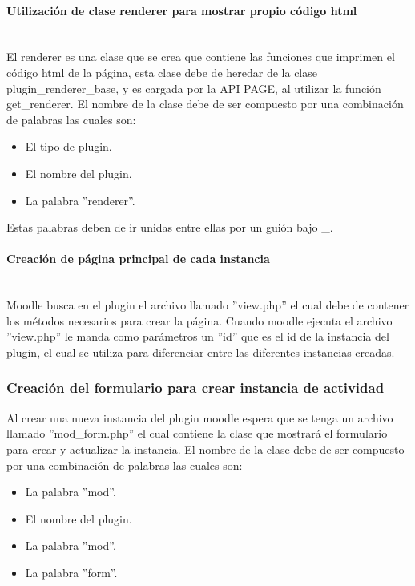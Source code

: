 			\paragraph{Utilización de clase renderer para mostrar propio código html}\mbox{}\\

			El renderer es una clase que se crea que contiene las funciones que imprimen el código html de la página, esta clase debe de heredar de la clase plugin\_renderer\_base, y es cargada por la API PAGE, al utilizar la función get\_renderer. El nombre de la clase debe de ser compuesto por una combinación de palabras las cuales son:
      \begin{itemize}
        \item El tipo de plugin.
        \item El nombre del plugin.
        \item La palabra ''renderer''.
      \end{itemize}

			Estas palabras deben de ir unidas entre ellas por un guión bajo \_.

    \paragraph{Creación de página principal de cada instancia}\mbox{}\\

			Moodle busca en el plugin el archivo llamado ''view.php'' el cual debe de contener los métodos necesarios para crear la página. Cuando moodle ejecuta el archivo ''view.php'' le manda como parámetros un ''id'' que es el id de la instancia del plugin, el cual se utiliza para diferenciar entre las diferentes instancias creadas.

  \subsubsection{Creación del formulario para crear instancia de actividad}
		Al crear una nueva instancia del plugin moodle espera que se tenga un archivo llamado ''mod\_form.php'' el cual contiene la clase que mostrará el formulario para crear y actualizar la instancia. El nombre de la clase debe de ser compuesto por una combinación de palabras las cuales son:
    \begin{itemize}
      \item La palabra ''mod''.
      \item El nombre del plugin.
      \item La palabra ''mod''.
      \item La palabra ''form''.
    \end{itemize}

